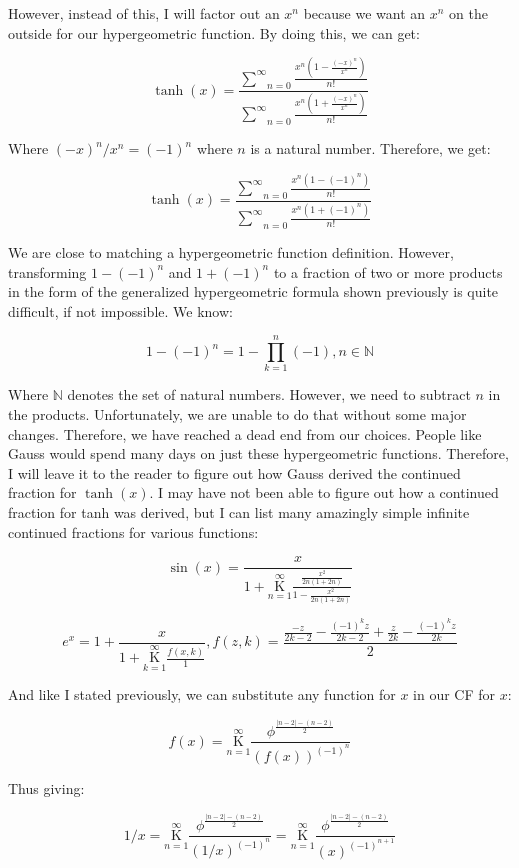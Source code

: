 \documentclass{article}
\begin{document}
However, instead of this, I will factor out an $x^n$ because we want an $x^n$ on the outside for our hypergeometric function. By doing this, we can get:

$$\tanh(x)=\frac{\underset{n=0}{\overset{\infty}{\sum}} \frac{x^n (1-\frac{(-x)^{n}}{x^n})}{n!}}{\underset{n=0}{\overset{\infty}{\sum}} \frac{x^n (1+\frac{(-x)^{n}}{x^n})}{n!}}$$

Where $(-x)^n / x^n = (-1)^n$ where $n$ is a natural number. Therefore, we get:

$$\tanh(x)=\frac{\underset{n=0}{\overset{\infty}{\sum}} \frac{x^n (1-(-1)^n)}{n!}}{\underset{n=0}{\overset{\infty}{\sum}} \frac{x^n (1+(-1)^n)}{n!}}$$

We are close to matching a hypergeometric function definition. However, transforming $1-(-1)^n$ and $1+(-1)^n$ to a fraction of two or more products in the form of the generalized hypergeometric formula shown previously is quite difficult, if not impossible. We know:

$$1-(-1)^n=1-\underset{k=1}{\overset{n}{\prod}}(-1), n \in \mathbb{N}$$

Where $\mathbb{N}$ denotes the set of natural numbers. However, we need to subtract $n$ in the products. Unfortunately, we are unable to do that without some major changes. Therefore, we have reached a dead end from our choices. People like Gauss would spend many days on just these hypergeometric functions. Therefore, I will leave it to the reader to figure out how Gauss derived the continued fraction for $\tanh(x)$. I may have not been able to figure out how a continued fraction for tanh was derived, but I can list many amazingly simple infinite continued fractions for various functions:

$$\sin(x)=\frac{x}{1+\underset{n=1}{\overset{\infty}{\mathrm K}} \frac{\frac{x^2}{2n(1+2n)}}{1-\frac{x^2}{2n(1+2n)}}}$$

$$e^x=1+\frac{x}{1+\underset{k=1}{\overset{\infty}{\mathrm K}} \frac{f(x,k)}{1}}, f(z,k)=\frac{\frac{-z}{2k-2}-\frac{(-1)^kz}{2k-2}+\frac{z}{2k}-\frac{(-1)^kz}{2k}}{2}$$

And like I stated previously, we can substitute any function for $x$ in our CF for $x$:

$$f(x)=\underset{n=1}{\overset{\infty}{\mathrm K}} \frac{\phi ^ {\frac{|n-2|-(n-2)}{2}}}{(f(x))^{(-1)^{n}}}$$

Thus giving:

$$1/x=\underset{n=1}{\overset{\infty}{\mathrm K}} \frac{\phi ^ {\frac{|n-2|-(n-2)}{2}}}{(1/x)^{(-1)^{n}}}= \underset{n=1}{\overset{\infty}{\mathrm K}} \frac{\phi ^ {\frac{|n-2|-(n-2)}{2}}}{(x)^{(-1)^{n+1}}}$$
\end{document}
